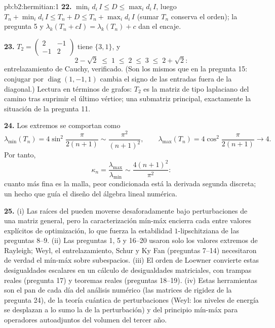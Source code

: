 \begin{solution}{pb:b2:hermitian:1}
\textbf{22.} $\min_id_i\,I \leq D \leq \max_id_i\,I$, luego $T_n +
\min_id_i\,I \leq T_n + D \leq T_n + \max_id_i\,I$ (sumar $T_n$
conserva el orden); la pregunta 5 y $\lambda_k(T_n + cI) =
\lambda_k(T_n) + c$ dan el encaje.

\textbf{23.} $T_2 = \begin{pmatrix} 2 & -1\\ -1 & 2\end{pmatrix}$
tiene  $\{3, 1\}$, y
\[
2 - \sqrt2 \;\leq\; 1 \;\leq\; 2 \;\leq\; 3 \;\leq\; 2 +
\sqrt2 :
\]
entrelazamiento de Cauchy, verificado. (Son los mismos  que
en la pregunta 15: conjugar por $\operatorname{diag}(1,-1,1)$ cambia
el signo de las entradas fuera de la diagonal.) Lectura en términos
de grafos: $T_2$ es la matriz de tipo laplaciano del camino tras
suprimir el último vértice; una submatriz principal, exactamente la
situación de la pregunta 11.

\textbf{24.} Los  extremos se comportan como
\[
\lambda_{\min}(T_n) = 4\sin^2\frac{\pi}{2(n+1)}
\sim \frac{\pi^2}{(n+1)^2},
\qquad
\lambda_{\max}(T_n) = 4\cos^2\frac{\pi}{2(n+1)}
\longrightarrow 4 .
\]
Por tanto,
\[
\kappa_n = \frac{\lambda_{\max}}{\lambda_{\min}}
\sim \frac{4(n+1)^2}{\pi^2} :
\]
cuanto más fina es la malla, peor condicionada está la derivada
segunda discreta; un hecho que guía el diseño del álgebra lineal
numérica.

\textbf{25.} (i) Las raíces del  pueden
moverse desaforadamente bajo perturbaciones de una matriz general,
pero la caracterización mín-máx encierra cada 
 entre valores explícitos de optimización, lo que fuerza
la estabilidad $1$-lipschitziana de las preguntas 8--9. (ii) Las
preguntas 1, 5 y 16--20 usaron solo los valores extremos de Rayleigh;
Weyl, el entrelazamiento, Schur y Ky Fan (preguntas 7--14)
necesitaron de verdad el mín-máx  sobre subespacios. (iii) El
orden de Loewner convierte estas desigualdades escalares en un
cálculo de desigualdades matriciales, con trampas reales (pregunta
17) y teoremas reales (preguntas 18--19). (iv) Estas herramientas son
el pan de cada día del análisis numérico (las matrices de rigidez de
la pregunta 24), de la teoría cuántica de perturbaciones (Weyl: los
niveles de energía se desplazan a lo sumo la  de la
perturbación) y del principio mín-máx para operadores 
autoadjuntos del volumen del tercer año.
\end{solution}
